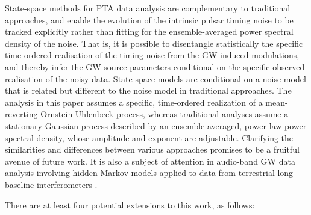 \documentclass[fleqn,usenatbib,useAMS]{mnras}
\begin{document}
State-space methods for PTA data analysis are complementary to traditional approaches, and enable the evolution of the intrinsic pulsar timing noise to be tracked explicitly rather than fitting for the ensemble-averaged power spectral density of the noise. That is, it is possible to disentangle statistically the specific time-ordered realisation of the timing noise from the GW-induced modulations, and thereby infer the GW source parameters conditional on the specific observed realisation of the noisy data. State-space models are conditional on a noise model that is related but different to the noise model in traditional approaches. The analysis in this paper assumes a specific, time-ordered realization of a mean-reverting Ornstein-Uhlenbeck process, whereas traditional analyses assume a stationary Gaussian process described by an ensemble-averaged, power-law power spectral density, whose amplitude and exponent are adjustable. Clarifying the similarities and differences between various approaches promises to be a fruitful avenue of future work. It is also a subject of attention in audio-band GW data analysis involving hidden Markov models applied to data from terrestrial long-baseline interferometers \citep{PhysRevD.102.023006,PhysRevD.105.022002,Abbott_2022SCO,2022PhRvD.106f2002A}. \newline 

There are at least four potential extensions to this work, as follows:
\end{document}
